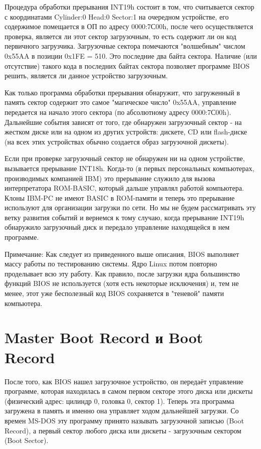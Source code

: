 Процедура обработки прерывания INT19h состоит в том, что считывается сектор с координатами Cylinder:0 Head:0 Sector:1 на очередном устройстве, его содержимое помещается в ОП по адресу 0000:7С00h, после чего осуществляется проверка, является ли этот сектор загрузочным, то есть содержит ли он код первичного загрузчика. Загрузочные сектора помечаются "волшебным" числом 0x55AA в позиции 0x1FE = 510. Это последние два байта сектора. Наличие (или отсутствие) такого кода в последних байтах сектора позволяет программе BIOS решить, является ли данное устройство загрузочным.

Как только программа обработки прерывания обнаружит, что загруженный в память сектор содержит это самое "магическое число" 0x55AA, управление передается на начало этого сектора (по абсолютному адресу 0000:7С00h). Дальнейшие события зависят от того, где обнаружен загрузочный сектор - на жестком диске или на одном из других устройств: дискете, CD или flash-диске (на всех этих устройствах обычно создается образ загрузочной дискеты).

Если при проверке загрузочный сектор не обнаружен ни на одном устройстве, вызывается прерывание INT18h. Когда-то (в первых персональных компьютерах, производимых компанией IBM) это прерывание служило для вызова интерпретатора ROM-BASIC, который дальше управлял работой компьютера. Клоны IBM-PC не имеют BASIC в ROM-памяти и теперь это прерывание используют для организации загрузки по сети. Но мы не будем рассматривать эту ветку развития событий и вернемся к тому случаю, когда прерывание INT19h обнаружило загрузочный диск и передало управление находящейся в нем программе.

Примечание: Как следует из приведенного выше описания, BIOS выполняет массу работы по тестированию системы. Ядро Linux потом повторно проделывает всю эту работу. Как правило, после загрузки ядра большинство функций BIOS не используется (хотя есть некоторые исключения) и, тем не менее, этот уже бесполезный код BIOS сохраняется в "теневой" памяти компьютера.

\newpage
\section{Master Boot Record и Boot Record}

После того, как BIOS нашел загрузочное устройство, он передаёт управление программе, которая находилась в самом первом секторе этого диска или дискеты (физический адрес: цилиндр 0, головка 0, сектор 1). Теперь эта программа загружена в память и именно она управляет ходом дальнейшей загрузки. Со времен MS-DOS эту программу принято называть загрузочной записью (Boot Record), а первый сектор любого диска или дискеты - загрузочным сектором (Boot Sector).

